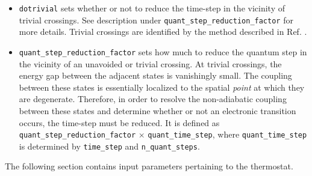 \documentclass[letterpaper,12pt,titlepage]{article}
\begin{document}
\begin{itemize}
\item \verb+dotrivial+ sets whether or not to reduce the time-step in the vicinity of trivial crossings.  See description under \verb+quant_step_reduction_factor+ for more details.  Trivial crossings are identified by the method described in Ref. \cite{fernandez2012identification}.
\item \verb+quant_step_reduction_factor+ sets how much to reduce the quantum step in the vicinity of an unavoided or trivial crossing.  At trivial crossings, the energy gap between the adjacent states is vanishingly small.  The coupling between these states is essentially localized to the spatial {\it{point}} at which they are degenerate.  Therefore, in order to resolve the non-adiabatic coupling between these states and determine whether or not an electronic transition occurs, the time-step must be reduced.  It is defined as \verb+quant_step_reduction_factor+ $\times$ \verb+quant_time_step+, where \verb+quant_time_step+ is determined by \verb+time_step+ and \verb+n_quant_steps+.
\end{itemize}

The following section contains input parameters pertaining to the thermostat.
\end{document}
